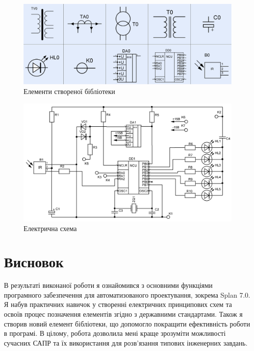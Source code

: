 \documentclass[a4paper]{article}
\begin{document}
    \begin{figure}[h]
        \centering
        \includegraphics[width=1\textwidth]{imgs/LW1.1.png}
        \caption{Елементи створеної бібліотеки}
        \label{fig:image_label1}
    \end{figure} 

    \newpage 

    \begin{figure}[h]
        \centering
        \includegraphics[width=1\textwidth]{imgs/LW1.2.png}
        \caption{Електрична схема}
        \label{fig:image_label2}
    \end{figure} 

    \section*{Висновок}
    В результаті виконаної роботи я ознайомився з основними функціями програмного забезпечення 
    для автоматизованого проектування, зокрема Splan 7.0. Я набув практичних навичок у створенні 
    електричних принципових схем та освоїв процес позначення елементів згідно з державними стандартами. 
    Також я створив новий елемент бібліотеки, що допомогло покращити ефективність роботи в програмі. 
    В цілому, робота дозволила мені краще зрозуміти можливості сучасних САПР та їх використання для 
    розв'язання типових інженерних завдань.
\end{document}
